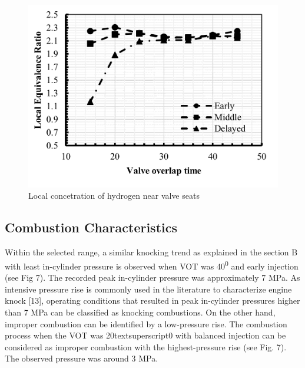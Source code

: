 \documentclass[conference]{IEEEtran}
\begin{document}
\begin{figure}[htbp]
    \centerline{\includegraphics{plots and graphs/6.png}}
    \caption{Local concetration of hydrogen near valve seats}
    \label{plt_6}
    \end{figure}
    

\subsection{Combustion Characteristics}
Within the selected range, a similar knocking trend as explained in the section B with least in-cylinder pressure is observed when VOT was 40\textsuperscript{0} and early injection (see Fig 7). 
The recorded peak in-cylinder pressure was approximately 7 MPa. 
As intensive pressure rise is commonly used in the literature to characterize engine knock [13], operating conditions that resulted in peak in-cylinder pressures higher than 7 MPa can be classified as knocking combustions. 
On the other hand, improper combustion can be identified by a low-pressure rise. 
The combustion process when the VOT was 20textsuperscript{0} with balanced injection can be considered as improper combustion with the highest-pressure rise (see Fig. 7). 
The observed pressure was around 3 MPa.
\end{document}
